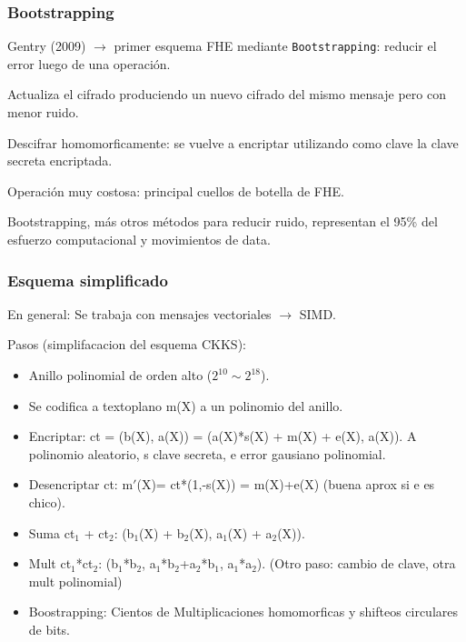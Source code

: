 \documentclass[10pt]{beamer}
\begin{document}
\begin{frame}
\frametitle{Bootstrapping}
Gentry (2009) $\to$ primer  esquema FHE mediante \texttt{Bootstrapping}: reducir el error luego de una operación.

\pause
Actualiza el cifrado produciendo un nuevo cifrado del mismo mensaje pero con menor ruido.

\pause
Descifrar homomorficamente: se vuelve a encriptar utilizando como clave la clave secreta encriptada.

\pause
Operación muy costosa: principal cuellos de botella de FHE.



\pause
\begin{mdframed}[backgroundcolor=frenchblue!20]
  Bootstrapping, más otros métodos para reducir ruido, representan el 95\% del esfuerzo computacional y movimientos de data.
\end{mdframed}
\end{frame}

  \begin{frame}
\frametitle{Esquema simplificado}
En general: Se trabaja con mensajes vectoriales $\to$ SIMD.
    \vspace{-0.3cm}

\pause
  Pasos (simplifacacion del esquema CKKS):
    \vspace{-0.3cm}
\begin{itemize}
  \item Anillo polinomial de orden alto ($2^{10} \sim 2^{18}$).
\pause
    \vspace{-0.3cm}
  \item Se codifica a textoplano m(X) a un polinomio del anillo.
\pause
    \vspace{-0.3cm}
  \item Encriptar: ct = (b(X), a(X)) = (a(X)*s(X) + m(X) + e(X), a(X)). A polinomio aleatorio, s clave secreta, e error gausiano polinomial.
\pause
    \vspace{-0.3cm}
  \item Desencriptar ct: m$'$(X)= ct*(1,-s(X)) = m(X)+e(X) (buena aprox si e es chico).
\pause
    \vspace{-0.3cm}
  \item Suma ct$_1$ + ct$_2$: (b$_1$(X) + b$_2$(X), a$_1$(X) + a$_2$(X)).
\pause
    \vspace{-0.3cm}
  \item Mult ct$_1$*ct$_2$: (b$_1$*b$_2$, a$_1$*b$_2$+a$_2$*b$_1$, a$_1$*a$_2$). (Otro paso: cambio de clave, otra mult polinomial)
\pause
    \vspace{-0.3cm}
  \item Boostrapping: Cientos de Multiplicaciones homomorficas y shifteos circulares de bits.
\end{itemize}

\end{frame}
\end{document}
